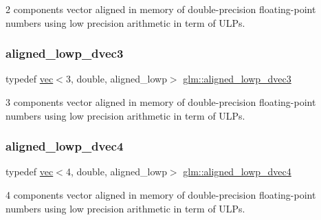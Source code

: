 2 components vector aligned in memory of double-\/precision floating-\/point numbers using low precision arithmetic in term of U\+L\+Ps. 

\mbox{\label{group__gtc__type__aligned_gab8af6a04a9e5c763725913b11df3cec0}} 
\subsubsection{\texorpdfstring{aligned\+\_\+lowp\+\_\+dvec3}{aligned\_lowp\_dvec3}}
{\footnotesize\ttfamily typedef \hyperlink{structglm_1_1vec}{vec}$<$3, double, aligned\+\_\+lowp$>$ \hyperlink{group__gtc__type__aligned_gab8af6a04a9e5c763725913b11df3cec0}{glm\+::aligned\+\_\+lowp\+\_\+dvec3}}



3 components vector aligned in memory of double-\/precision floating-\/point numbers using low precision arithmetic in term of U\+L\+Ps. 

\mbox{\label{group__gtc__type__aligned_ga0c40d2f75a8bdae67116c4c973252baf}} 
\subsubsection{\texorpdfstring{aligned\+\_\+lowp\+\_\+dvec4}{aligned\_lowp\_dvec4}}
{\footnotesize\ttfamily typedef \hyperlink{structglm_1_1vec}{vec}$<$4, double, aligned\+\_\+lowp$>$ \hyperlink{group__gtc__type__aligned_ga0c40d2f75a8bdae67116c4c973252baf}{glm\+::aligned\+\_\+lowp\+\_\+dvec4}}



4 components vector aligned in memory of double-\/precision floating-\/point numbers using low precision arithmetic in term of U\+L\+Ps. 

\mbox{\label{group__gtc__type__aligned_gadf9e665b78c3aead513e9505fa31f9e2}} 
